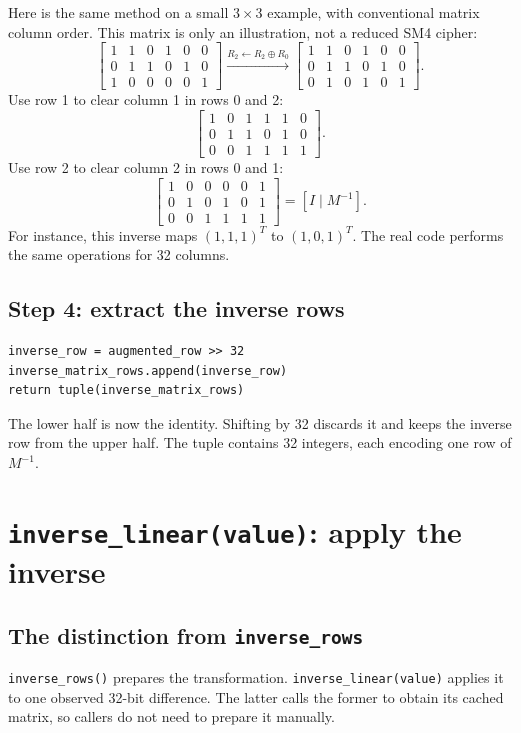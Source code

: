 \documentclass[11pt,a4paper]{article}
\newcommand{\hx}[1]{\texttt{#1}}
\newcommand{\xor}{\mathbin{\oplus}}
\begin{document}
Here is the same method on a small $3\times3$ example, with conventional matrix
column order. This matrix is only an illustration, not a reduced SM4 cipher:
\[
\left[\begin{array}{ccc|ccc}
1&1&0&1&0&0\\0&1&1&0&1&0\\1&0&0&0&0&1
\end{array}\right]
\xrightarrow{R_2\gets R_2\xor R_0}
\left[\begin{array}{ccc|ccc}
1&1&0&1&0&0\\0&1&1&0&1&0\\0&1&0&1&0&1
\end{array}\right].
\]
Use row 1 to clear column 1 in rows 0 and 2:
\[
\left[\begin{array}{ccc|ccc}
1&0&1&1&1&0\\0&1&1&0&1&0\\0&0&1&1&1&1
\end{array}\right].
\]
Use row 2 to clear column 2 in rows 0 and 1:
\[
\left[\begin{array}{ccc|ccc}
1&0&0&0&0&1\\0&1&0&1&0&1\\0&0&1&1&1&1
\end{array}\right]=[I\mid M^{-1}].
\]
For instance, this inverse maps $(1,1,1)^T$ to $(1,0,1)^T$.
The real code performs the same operations for 32 columns.

\subsection{Step 4: extract the inverse rows}
\begin{Verbatim}
inverse_row = augmented_row >> 32
inverse_matrix_rows.append(inverse_row)
return tuple(inverse_matrix_rows)
\end{Verbatim}
The lower half is now the identity. Shifting by 32 discards it and keeps the
inverse row from the upper half. The tuple contains 32 integers, each encoding
one row of $M^{-1}$.

\section{\texorpdfstring{\texttt{inverse\_linear(value)}}{inverse_linear}: apply the inverse}
\subsection{The distinction from \texttt{inverse\_rows}}
\hx{inverse\_rows()} prepares the transformation. \hx{inverse\_linear(value)}
applies it to one observed 32-bit difference. The latter calls the former to
obtain its cached matrix, so callers do not need to prepare it manually.
\end{document}
